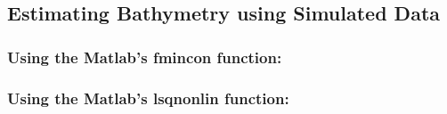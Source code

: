 \subsection{Estimating Bathymetry using Simulated Data}

\subsubsection{Using the Matlab's fmincon function: }

\subsubsection{Using the Matlab's lsqnonlin function: }